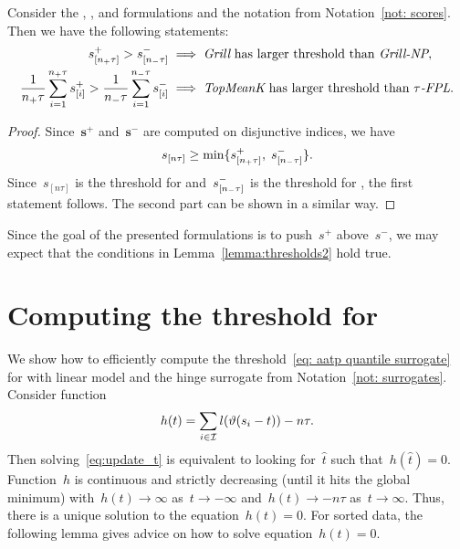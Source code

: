 \begin{lemma}\label{lemma:thresholds2}
  Consider the \Grill, \GrillNP, \TopMeanK and \tauFPL formulations and the notation from Notation~\ref{not: scores}. Then we have the following statements:
  \begin{equation*}
    \begin{aligned}
      s_{[n_{+}\tau]}^+ > s_{[n_{-}\tau]}^-
        & \implies \emph{Grill} \text{ has larger threshold than }\emph{Grill-NP}, \\
      \frac{1}{n_{+}\tau}\sum_{i=1}^{n_{+}\tau} s_{[i]}^+
      > \frac{1}{n_{-}\tau}\sum_{i=1}^{n_{-}\tau} s_{[i]}^-
        & \implies \emph{TopMeanK} \text{ has larger threshold than }{\emph{$\tau$-FPL}}. \\
    \end{aligned}
  \end{equation*}
\end{lemma}

\begin{proof}
  Since~$\bm{s}^+$ and~$\bm{s}^-$ are computed on disjunctive indices, we have
  \begin{equation*}
    s_{[n\tau]} \ge \min\{s_{[n_{+}\tau]}^+, \; s_{[n_{-}\tau]}^-\}.
  \end{equation*}
  Since~$s_{[n\tau]}$ is the threshold for \Grill and~$s_{[n_{-}\tau]}^-$ is the threshold for \GrillNP, the first statement follows. The second part can be shown in a similar way.
\end{proof}
  
\noindent Since the goal of the presented formulations is to push~$s^+$ above~$s^-$, we may expect that the conditions in Lemma~\ref{lemma:thresholds2} hold true. 

\section{Computing the threshold for \PatMat}\label{app:threshold}

We show how to efficiently compute the threshold~\eqref{eq: aatp quantile surrogate} for \PatMat with linear model and the hinge surrogate from Notation~\ref{not: surrogates}. Consider function
\begin{equation}\label{eq:defin_h}
  h(t) = \sum_{i \in \I} l\Brac{\vartheta(s_i - t)} - n\tau.
\end{equation}
Then solving~\eqref{eq:update_t} is equivalent to looking for~$\hat{t}$ such that~$h(\hat{t}) = 0$. Function~$h$ is continuous and strictly decreasing (until it hits the global minimum) with~$h(t) \to \infty$ as~$t \to -\infty$ and~$h(t) \to -n\tau$ as~$t \to \infty$. Thus, there is a unique solution to the equation~$h(t) = 0$. For sorted data, the following lemma gives advice on how to solve equation~$h(t) = 0$. 

